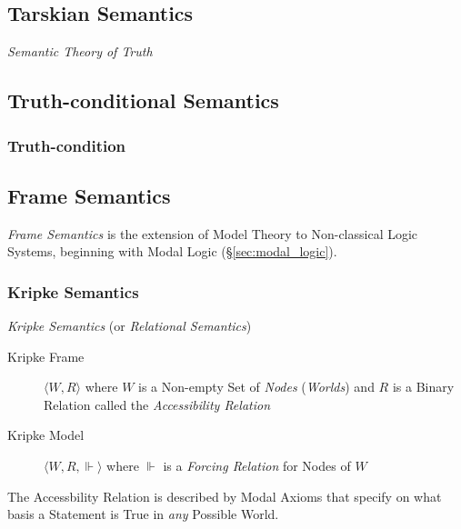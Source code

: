 \subsection{Tarskian Semantics}\label{sec:tarski_semantics}

\emph{Semantic Theory of Truth}



\subsection{Truth-conditional Semantics}
\label{sec:truth_conditional_semantics}

\subsubsection{Truth-condition}\label{sec:truth_condition}



\subsection{Frame Semantics}\label{sec:frame_semantics}

\emph{Frame Semantics} is the extension of Model Theory to
Non-classical Logic Systems, beginning with Modal Logic
(\S\ref{sec:modal_logic}).



\subsubsection{Kripke Semantics}\label{sec:kripke_semantics}

\emph{Kripke Semantics} (or \emph{Relational Semantics})

\begin{description}
\item [Kripke Frame] $\langle W,R \rangle$ where $W$ is a Non-empty
  Set of \emph{Nodes} (\emph{Worlds}) and $R$ is a Binary Relation
  called the \emph{Accessibility Relation}
\item [Kripke Model] $\langle W,R,\Vdash \rangle$ where $\Vdash$ is a
  \emph{Forcing Relation} for Nodes of $W$
\end{description}
The Accessbility Relation is described by Modal Axioms that specify on
what basis a Statement is True in \emph{any} Possible World.

